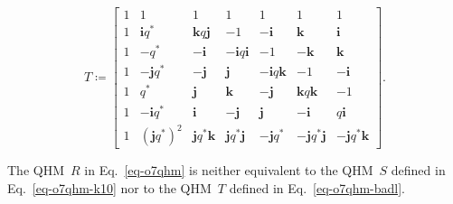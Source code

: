 \documentclass[10pt,a4paper]{amsart}
\newcommand{\eqdef}{\coloneqq}
\newcommand{\qi}{\mathbf{i}}
\newcommand{\qj}{\mathbf{j}}
\newcommand{\qk}{\mathbf{k}}
\begin{document}
\begin{equation}
\label{eq-o7qhm-badl}
T \eqdef
\begin{bmatrix}
1 & 1 & 1 & 1 & 1 & 1 & 1 \\
1 & \qi q^* & \qk q \qj & -1 & -\qi & \qk & \qi \\
1 & -q^* & -\qi & -\qi q \qi & -1 & -\qk & \qk \\
1 & -\qj q^* & -\qj & \qj & -\qi q \qk & -1 & -\qi \\
1 & q^* & \qj & \qk & -\qj & \qk q \qk & -1 \\
1 & -\qi q^* & \qi & -\qj & \qj & -\qi & q \qi \\
1 & (\qj q^*)^2 & \qj q^* \qk & \qj q^* \qj & -\qj q^* & -\qj q^* \qj & -\qj q^* \qk
\end{bmatrix} .
\end{equation}

\begin{proposition}
\label{prop-o7-nonequiv}
The QHM\/~$R$ in Eq.~\eqref{eq-o7qhm} is neither equivalent to the QHM\/~$S$ defined in Eq.~\eqref{eq-o7qhm-k10} nor to the QHM\/~$T$ defined in Eq.~\eqref{eq-o7qhm-badl}.
\end{proposition}
\end{document}
